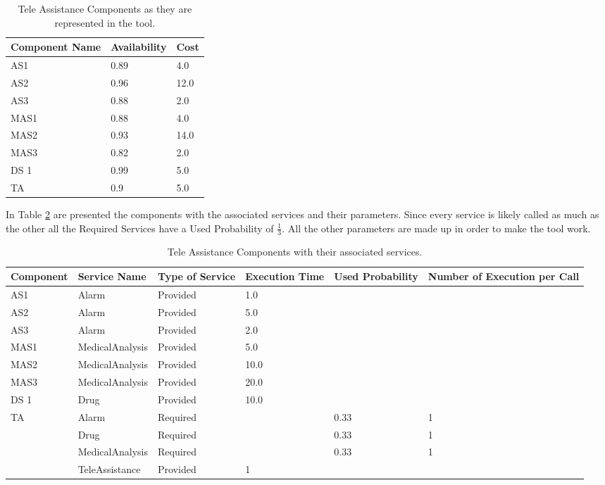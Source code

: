\begin{table}[ht!b]
	\centering
	\begin{tabular}{|p{3cm}|p{2.5cm}|p{1cm}|}
		\hline 
		\textbf{Component Name} & \textbf{Availability} & \textbf{Cost} \\ 
		\hline 
		AS1 & 0.89 & 4.0 \\
		\hline 
		AS2 & 0.96 & 12.0 \\ 
		\hline 
		AS3 & 0.88 & 2.0 \\ 
		\hline 
		MAS1 & 0.88 & 4.0 \\ 
		\hline
		MAS2 & 0.93 & 14.0 \\ 
		\hline
		MAS3 & 0.82 & 2.0 \\ 
		\hline
		DS 1 & 0.99 & 5.0 \\ 
		\hline
		TA & 0.9 & 5.0 \\ 
		\hline
		
	\end{tabular} 
	\caption[TAS Components]{Tele Assistance Components as they are represented in the tool.}
	\label{tab:tas-comp}
\end{table}
In Table \ref{tab:tas-serv} are presented the components with the associated services and their parameters. Since every service is likely called as much as the other all the Required Services have a Used Probability of $ \frac{1}{3} $. All the other parameters are made up in order to make the tool work.
\begin{table}[ht!b]
	\centering
	\begin{tabular}{|p{2cm}|p{2.5cm}|p{1.4cm}|p{1.7cm}|p{1.5cm}|p{1.8cm}|}
		\hline 
		\textbf{Component} & \textbf{Service Name} & \textbf{Type of Service} & \textbf{Execution Time} & \textbf{Used Probability} & \textbf{Number of Execution per Call} \\ 
		\hline 
		AS1 & Alarm & Provided & 1.0 & & \\
		\hline 
		AS2 & Alarm & Provided & 5.0 & & \\
		\hline 
		AS3 & Alarm & Provided & 2.0 & & \\
		\hline 
		MAS1 & MedicalAnalysis & Provided & 5.0 & & \\ 
		\hline
		MAS2 & MedicalAnalysis & Provided & 10.0 & & \\ 
		\hline
		MAS3 & MedicalAnalysis & Provided & 20.0 & & \\ 
		\hline
		DS 1 & Drug & Provided & 10.0 & & \\
		\hline
		\multirow{4}{*}{TA} & Alarm & Required & & 0.33 & 1 \\
		& Drug & Required & & 0.33 & 1 \\
		& MedicalAnalysis & Required & & 0.33 & 1 \\\cline{2-6}
		& TeleAssistance & Provided & 1 & & \\
		\hline
		
	\end{tabular} 
	\caption[TAS Service]{Tele Assistance Components with their associated services.}
	\label{tab:tas-serv}
\end{table}

